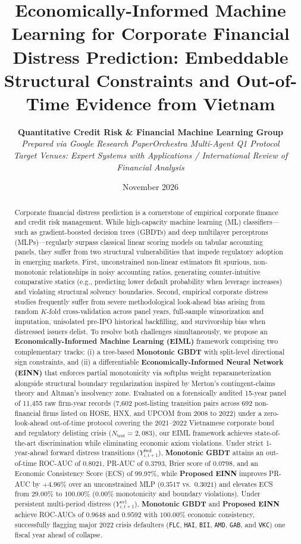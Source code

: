 \documentclass[11pt,a4paper]{article}
\title{\vspace{-1.2cm}\textbf{\Large Economically-Informed Machine Learning for Corporate Financial Distress Prediction: Embeddable Structural Constraints and Out-of-Time Evidence from Vietnam}}
\author{
    \textbf{Quantitative Credit Risk \& Financial Machine Learning Group}\\
    \small\textit{Prepared via Google Research PaperOrchestra Multi-Agent Q1 Protocol}\\
    \small\textit{Target Venues: Expert Systems with Applications / International Review of Financial Analysis}
}
\date{November 2026}
\begin{document}
\maketitle

\begin{abstract}
\noindent
Corporate financial distress prediction is a cornerstone of empirical corporate finance and credit risk management. While high-capacity machine learning (ML) classifiers---such as gradient-boosted decision trees (GBDTs) and deep multilayer perceptrons (MLPs)---regularly surpass classical linear scoring models on tabular accounting panels, they suffer from two structural vulnerabilities that impede regulatory adoption in emerging markets. First, unconstrained non-linear estimators fit spurious, non-monotonic relationships in noisy accounting ratios, generating counter-intuitive comparative statics (e.g., predicting lower default probability when leverage increases) and violating structural solvency boundaries. Second, empirical corporate distress studies frequently suffer from severe methodological look-ahead bias arising from random $K$-fold cross-validation across panel years, full-sample winsorization and imputation, unisolated pre-IPO historical backfilling, and survivorship bias when distressed issuers delist. To resolve both challenges simultaneously, we propose an \textbf{Economically-Informed Machine Learning (EIML)} framework comprising two complementary tracks: (i) a tree-based \textbf{Monotonic GBDT} with split-level directional sign constraints, and (ii) a differentiable \textbf{Economically-Informed Neural Network (EINN)} that enforces partial monotonicity via softplus weight reparameterization alongside structural boundary regularization inspired by Merton's contingent-claims theory and Altman's insolvency zone. Evaluated on a forensically audited 15-year panel of 11,455 raw firm-year records (7,602 post-listing transition pairs across 692 non-financial firms listed on HOSE, HNX, and UPCOM from 2008 to 2022) under a zero-look-ahead out-of-time protocol covering the 2021--2022 Vietnamese corporate bond and regulatory delisting crisis ($N_{\text{test}}=2,083$), our EIML framework achieves state-of-the-art discrimination while eliminating economic axiom violations. Under strict 1-year-ahead forward distress transitions ($Y_{i,t+1}^{\text{fwd}}$), \textbf{Monotonic GBDT} attains an out-of-time ROC-AUC of $0.8021$, PR-AUC of $0.3793$, Brier score of $0.0798$, and an Economic Consistency Score (ECS) of $99.97\%$, while \textbf{Proposed EINN} improves PR-AUC by $+4.96\%$ over an unconstrained MLP ($0.3517$ vs.\ $0.3021$) and elevates ECS from $29.00\%$ to $100.00\%$ ($0.00\%$ monotonicity and boundary violations). Under persistent multi-period distress ($Y_{i,t+1}^{\text{ovl}}$), \textbf{Monotonic GBDT} and \textbf{Proposed EINN} achieve ROC-AUCs of $0.9648$ and $0.9592$ with $100.00\%$ economic consistency, successfully flagging major 2022 crisis defaulters (\texttt{FLC}, \texttt{HAI}, \texttt{BII}, \texttt{AMD}, \texttt{GAB}, and \texttt{VKC}) one fiscal year ahead of collapse.


\end{abstract}
\end{document}
